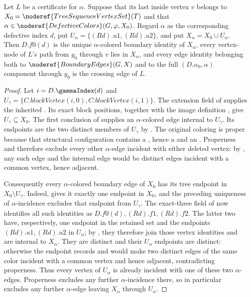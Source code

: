 \begin{helper}
Let $L$ be a  certificate for $\alpha$.
Suppose that its last inside vertex $v$ belongs to
$X_0=\noderef{TreeSequenceVertexSet}(T)$ and that
$\alpha\in\noderef{DefectiveColors}(G,\varphi,X_0)$.  Regard $\alpha$
as the corresponding defective index $d$, put
$U_\alpha=\{(R d).u1,(R d).u2\}$, and put
$X_\alpha=X_0\cup U_\alpha$.  Then $D.f0(d)$ is the unique
$\alpha$-colored boundary identity of $X_\alpha$, every vertex-node of
$L$'s path from $y_0$ through $v$ lies in $X_\alpha$, and every edge
identity belonging both to $\noderef{BoundaryEdges}(G,X)$ and to the full
$(D.\alpha_0,\alpha)$ component through $y_0$ is the crossing edge of
$L$.
\end{helper}
\begin{proof}
Let $i=D.\gammaIndex(d)$ and
$U_\gamma=\{C.\mathit{blockVertex}(i,0),C.\mathit{blockVertex}(i,1)\}$.
The extension field of  supplies the
inherited .  Its exact block
positions, together with the image definition
, give $U_\gamma\subseteq X_0$.
The first conclusion of 
supplies an $\alpha$-colored edge internal to $U_\gamma$.  Its endpoints
are the two distinct members of $U_\gamma$ by
.  The original coloring is proper because
that structural configuration contains a
, hence a  and an
.  Properness and
 therefore exclude every other $\alpha$-edge
incident with either deleted vertex: by , any such edge
and the internal edge would be distinct edges incident with a common
vertex, hence adjacent.

Consequently every $\alpha$-colored boundary edge of $X_0$ has its
tree endpoint in $X_0\setminus U_\gamma$.  Indeed,
 gives it exactly one endpoint in $X_0$, and the
preceding uniqueness of $\alpha$-incidence excludes that endpoint from
$U_\gamma$.  The exact-three field of
 now identifies all such identities as
$D.f0(d),(R d).f1,(R d).f2$.  The latter two have, respectively, one
endpoint in the retained set and the endpoints $(R d).u1,(R d).u2$ in
$U_\alpha$; by , they therefore join those vertex
identities and are internal to $X_\alpha$.  They are distinct and their
$U_\alpha$ endpoints are distinct: otherwise the endpoint records and
 would make two distinct edges of the same color
incident with a common vertex and hence adjacent, contradicting
properness.  Thus every vertex of $U_\alpha$ is already incident with one
of these two $\alpha$-edges.  Properness excludes any further
$\alpha$-incidence there, so in particular
 excludes any further $\alpha$-edge leaving
$X_\alpha$ through $U_\alpha$.


\end{proof}
